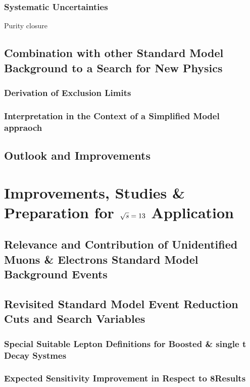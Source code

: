 \subsection{Systematic Uncertainties}
\label{sec:Lost_Lepton_8TeV_Uncertainties}
\todo Purity closure\\

\section{Combination with other Standard Model Background to a Search for New Physics}
\label{sec:Lost_Lepton_8TeV_RA2}
\subsection{Derivation of Exclusion Limits}
\label{sec:Lost_Lepton_8TeV_RA2_Limits}
\subsection{Interpretation in the Context of a Simplified Model appraoch}
\label{sec:Lost_Lepton_8TeV_RA2_SMS}
\section{Outlook and Improvements}
\label{sec:Lost_Lepton_8TeV_Outlook}


\chapter{Improvements, Studies \& Preparation for $\sqrt{s}=13$ \tev Application}
\label{sec:Lost_Lepton_13TeV}
\section{Relevance and Contribution of Unidentified Muons \& Electrons Standard Model Background Events}
\label{sec:Lost_Lepton_13TeV_SUSY_SearchImpact}
\section{Revisited Standard Model Event Reduction Cuts and Search Variables}
\label{sec:Lost_Lepton_13TeV_SearchStrategy}
\subsection{Special Suitable Lepton Definitions for Boosted \ttbar \& single t Decay Systmes}
\label{sec:Lost_Lepton_13TeV_BoostRegion}
\subsection{Expected Sensitivity Improvement in Respect to 8\tev Results}
\label{sec:Lost_Lepton_13TeV_Compare8TeV}


